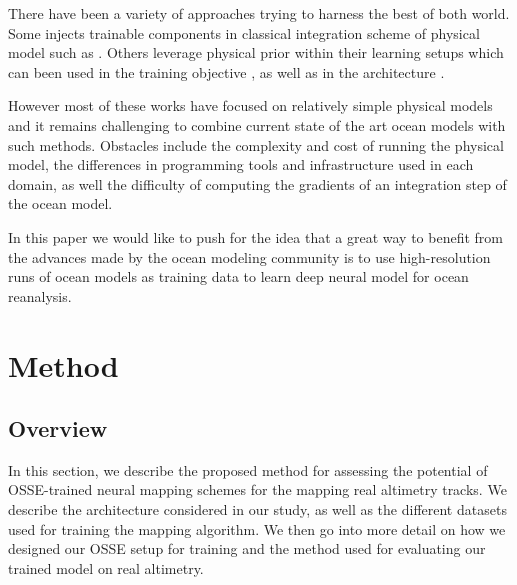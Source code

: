 \begin{bibunit}
There have been a variety of approaches trying to harness the best of both world. Some injects trainable components in classical integration scheme of physical model such as \cite{yinAugmentingPhysicalModels2021b}. Others leverage physical prior within their learning setups which can been used in the training objective \cite{raissiPhysicsinformedNeuralNetworks2019,greydanusHamiltonianNeuralNetworks2019}, as well as in the architecture \cite{li2020fourier,Wang2020TF}. 

However most of these works have focused on relatively simple physical models and it remains challenging to combine current state of the art ocean models with such methods. Obstacles include the complexity and cost of running the physical model, the differences in programming tools and infrastructure used in each domain, as well the difficulty of computing the gradients of an integration step of the ocean model.

In this paper we would like to push for the idea that a great way to benefit from the advances made by the ocean modeling community is to use high-resolution runs of ocean models as training data to learn deep neural model for ocean reanalysis. 





\section{Method}
\label{sec:method}


\subsection{Overview}
\label{ssec:overview}

In this section, we describe the proposed method for assessing the potential of OSSE-trained neural mapping schemes for the mapping real altimetry tracks. We describe the architecture considered in our study, as well as the different datasets used for training the mapping algorithm. We then go into more detail on how we designed our OSSE setup for training and the method used for evaluating our trained model on real altimetry.  


\end{bibunit}
